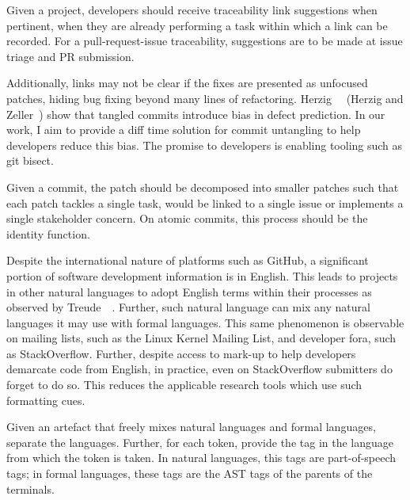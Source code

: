 \begin{tcolorbox}[title=Pull-request-Issue Traceability]
    Given a project, developers should receive traceability link suggestions
    when pertinent, \ie when they are already performing a task within which a
    link can be recorded. For a pull-request-issue traceability, suggestions are
    to be made at issue triage and PR submission.
\end{tcolorbox}

Additionally, links may not be clear if the fixes are presented as unfocused
patches, hiding bug fixing beyond many lines of refactoring.
Herzig~\etal~\cite{Herzig2016} (Herzig and Zeller~\cite{Herzig2013}) show that
tangled commits introduce bias in defect prediction. In our work, I aim to
provide a diff time solution for commit untangling to help developers reduce
this bias. The promise to developers is enabling tooling such as git bisect.

\begin{tcolorbox}[title=Commit Untangling]
    Given a commit, the patch should be decomposed into smaller patches such
    that each patch tackles a single task, \ie would be linked to a single issue
    or implements a single stakeholder concern. On atomic commits, this process
    should be the identity function.
\end{tcolorbox}

Despite the international nature of platforms such as GitHub, a significant
portion of software development information is in English. This leads to
projects in other natural languages to adopt English terms within their
processes as observed by Treude~\etal~\cite{Treude2015portuguese}. Further, such
natural language can mix any natural languages it may use with formal languages.
This same phenomenon is observable on mailing lists, such as the Linux Kernel
Mailing List, and developer fora, such as StackOverflow.  Further, despite
access to mark-up to help developers demarcate code from English, in practice,
even on StackOverflow submitters do forget to do so. This reduces the applicable
research tools which use such formatting cues.

\begin{tcolorbox}[title=Mixed-text Parsing]
    Given an artefact that freely mixes natural languages and formal languages,
    separate the languages. Further, for each token, provide the tag in the
    language from which the token is taken. In natural languages, this tags are
    part-of-speech tags; in formal languages, these tags are the AST tags of the
    parents of the terminals.
\end{tcolorbox}

